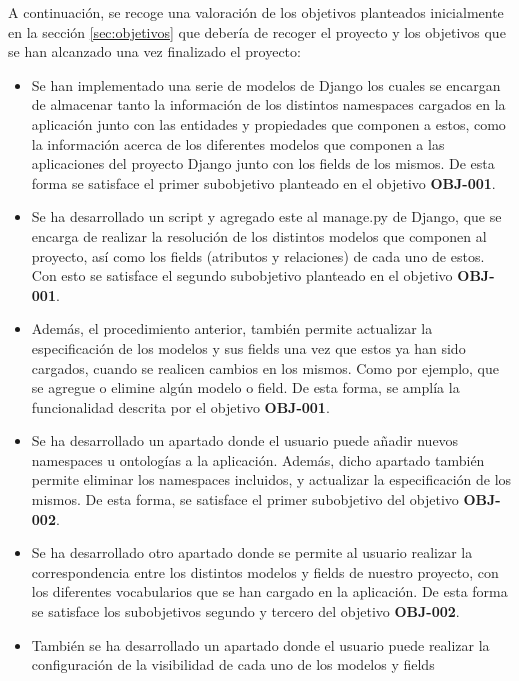 A continuación, se recoge una valoración de los objetivos planteados
inicialmente en la sección \ref{sec:objetivos} que debería de recoger el
proyecto y los objetivos que se han alcanzado una vez finalizado el proyecto:
\begin{itemize}
    \item Se han implementado una serie de modelos de Django los cuales se
        encargan de almacenar tanto la información de los distintos namespaces
        cargados en la aplicación junto con las entidades y propiedades que
        componen a estos, como la información acerca de los diferentes modelos
        que componen a las aplicaciones del proyecto Django junto con los fields
        de los mismos. De esta forma se satisface el primer subobjetivo
        planteado en el objetivo \textbf{OBJ-001}.
    \item Se ha desarrollado un script y agregado este al manage.py de Django,
    	que se encarga de realizar la resolución de los distintos modelos que
        componen al proyecto, así como los fields (atributos y relaciones) de
        cada uno de estos. Con esto se satisface el segundo subobjetivo
        planteado en el objetivo \textbf{OBJ-001}.
    \item Además, el procedimiento anterior, también permite actualizar la
        especificación de los modelos y sus fields una vez que estos ya han sido
        cargados, cuando se realicen cambios en los mismos. Como por ejemplo,
        que se agregue o elimine algún modelo o field. De esta forma, se amplía
        la funcionalidad descrita por el objetivo \textbf{OBJ-001}.
    \item Se ha desarrollado un apartado donde el usuario puede añadir nuevos
        namespaces u ontologías a la aplicación. Además, dicho apartado también
        permite eliminar los namespaces incluidos, y actualizar la
        especificación de los mismos. De esta forma, se satisface el primer
        subobjetivo del objetivo \textbf{OBJ-002}.
    \item Se ha desarrollado otro apartado donde se permite al usuario realizar
        la correspondencia entre los distintos modelos y fields de nuestro
        proyecto, con los diferentes vocabularios que se han cargado en la
        aplicación. De esta forma se satisface los subobjetivos segundo y
        tercero del objetivo \textbf{OBJ-002}.
    \item También se ha desarrollado un apartado donde el usuario puede realizar
    	la configuración de la visibilidad de cada uno de los modelos y fields

\end{itemize}
